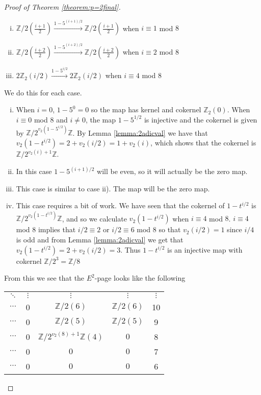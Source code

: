 \documentclass[a4paper]{article} %
\theoremstyle{definition}
\newcommand{\toWithMapLong}[1]{\overset{#1}{\longrightarrow}}
\newcommand{\Z}{\mathbb{Z}}
\begin{document}
\begin{proof}[Proof of Theorem \ref{theorem:p=2final}]
\begin{enumerate}[i)]
    \item $\Z/2(\frac{i+1}{2}) \toWithMapLong{1-5^{(i+1)/2}} \Z/2(\frac{i+1}{2})$ when $i \equiv 1$ mod $8$
    \item $\Z/2(\frac{i+2}{2}) \toWithMapLong{1-5^{(i+2)/2}} \Z/2(\frac{i+2}{2})$ when $i \equiv 2$ mod $8$
    \item $2\Z_2(i/2) \toWithMapLong{1-5^{i/2}} 2\Z_2(i/2)$ when $i \equiv 4$ mod $8$
  \end{enumerate}
  We do this for each case.
  \begin{enumerate}[i)]
    \item When $i=0$, $1-5^0 = 0$ so the map has kernel and cokernel $\Z_2(0)$. When $i \equiv 0$ mod $8$ and $i \neq 0$, the map $1-5^{1/2}$ is injective and the cokernel is given by $\Z/2^{v_2(1-5^{i/2})}\Z$. By Lemma \ref{lemma:2adicval} we have that $v_2(1-t^{i/2}) = 2 + v_2(i/2) = 1 + v_2(i)$,
    which shows that the cokernel is $\Z/2^{v_2(i)+1}\Z$.
    \item In this case $1-5^{(i+1)/2}$ will be even, so it will actually be the zero map.
    \item This case is similar to case ii). The map will be the zero map.
    \item This case requires a bit of work. We have seen that the cokernel of $1-t^{i/2}$ is $\Z/2^{v_2(1-t^{i/2})}\Z$, and so we calculate $v_2({1-t^{i/2}})$ when $i \equiv 4$ mod $8$. $i \equiv 4$ mod $8$ implies that $i/2 \equiv 2$ or $i/2 \equiv 6$ mod $8$ so that $v_2(i/2) = 1$ since $i/4$ is odd
    and from Lemma \ref{lemma:2adicval} we get that $v_2(1-t^{i/2}) = 2 + v_2(i/2) = 3$. Thus $1-t^{i/2}$ is an injective map with cokernel $\Z/2^3 = \Z/8$
  \end{enumerate}
  From this we see that the $E^2$-page looks like the following
  \begin{table}[H]
    \centering
    \setlength{\tabcolsep}{12pt}
    \setlength{\extrarowheight}{2pt}
  \begin{tabular}{cccc|c}
    $\ddots$        &   $\vdots$ &  $\vdots$  & $\vdots$  & $\vdots$ \\
    $\cdots$        &   0 &  $\Z/2(6)$  & $\Z/2(6)$  & 10 \\
    $\cdots$        &   0 &  $\Z/2(5)$  & $\Z/2(5)$  & 9 \\
    $\cdots$        &   0 &  $\Z/2^{v_2(8)+1}\Z(4)$  & $0$  & 8 \\
    $\cdots$        &   0 &  $0$  & $0$  & 7 \\
    $\cdots$        &   0 &  $0$  & $0$  & 6 \\

\end{tabular}
\end{table}
\end{proof}
\end{document}
